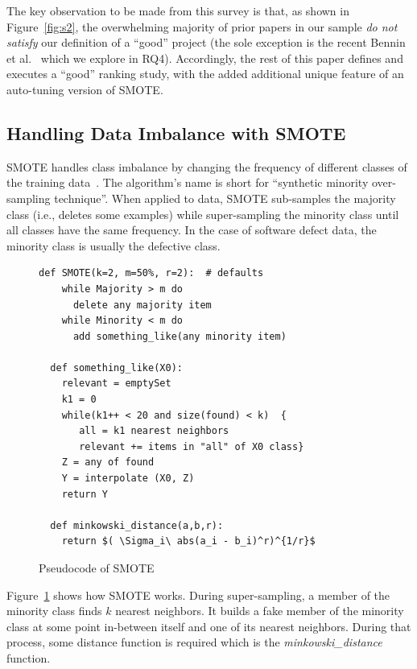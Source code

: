 \documentclass[sigconf,review, anonymous]{acmart}
\theoremstyle{break}
\theoremstyle{break}
\newcommand{\sma}{{\sc SMOTE}}
\begin{document}
The key observation to be made from  this 
survey is that, as shown in Figure~\ref{fig:s2}, the overwhelming majority of
prior papers in our sample {\em do not satisfy}  our definition of a ``good'' project
(the sole exception is the  recent   Bennin et al.~\cite{bennin2017mahakil} which we explore in RQ4).
Accordingly, the rest of this
paper defines and executes a ``good'' ranking  study, with the added additional
unique feature of   an auto-tuning version of {\sma}.

\subsection{Handling Data Imbalance with SMOTE}
\label{sect:smote}

{\sma} handles class imbalance by changing the frequency of different classes of the training
data~\cite{chawla2002smote}. 
The algorithm's name is short for ``synthetic minority over-sampling technique''.
When applied to data, {\sma} sub-samples the majority class (i.e., deletes some examples)
while super-sampling the minority class
until
all classes have the same frequency.  In the case of software defect data,
the minority class is usually the  defective class.



 \begin{figure}\small
\begin{lstlisting}[mathescape,linewidth=2in,frame=n,numbers=none]
  def SMOTE(k=2, m=50%, r=2):  # defaults
    while Majority > m do
      delete any majority item
    while Minority < m do
      add something_like(any minority item)
      
  def something_like(X0): 
    relevant = emptySet
    k1 = 0
    while(k1++ < 20 and size(found) < k)  {
       all = k1 nearest neighbors
       relevant += items in "all" of X0 class}
    Z = any of found
    Y = interpolate (X0, Z)
    return Y
    
  def minkowski_distance(a,b,r): 
    return $( \Sigma_i\ abs(a_i - b_i)^r)^{1/r}$
\end{lstlisting} 
\vspace{-0.2cm}
\caption{Pseudocode of SMOTE}
\label{fig:pseudocode} 
\vspace{-0.3cm}
\end{figure}
Figure~\ref{fig:pseudocode} shows how {\sma} works. During super-sampling,
a member of the minority class finds $k$ nearest neighbors. It builds a fake member
of the minority class at some point in-between itself and one of its nearest
neighbors.  During that process, some distance function is required which is the {\em minkowski\_distance} function. 
\end{document}
